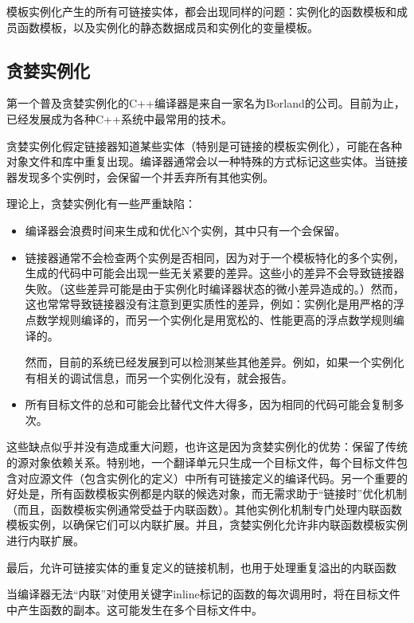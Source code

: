 模板实例化产生的所有可链接实体，都会出现同样的问题：实例化的函数模板和成员函数模板，以及实例化的静态数据成员和实例化的变量模板。

\subsection{贪婪实例化}

第一个普及贪婪实例化的C++编译器是来自一家名为Borland的公司。目前为止，已经发展成为各种C++系统中最常用的技术。

贪婪实例化假定链接器知道某些实体（特别是可链接的模板实例化），可能在各种对象文件和库中重复出现。编译器通常会以一种特殊的方式标记这些实体。当链接器发现多个实例时，会保留一个并丢弃所有其他实例。

理论上，贪婪实例化有一些严重缺陷：

\begin{itemize}
\item 
编译器会浪费时间来生成和优化N个实例，其中只有一个会保留。

\item 
链接器通常不会检查两个实例是否相同，因为对于一个模板特化的多个实例，生成的代码中可能会出现一些无关紧要的差异。这些小的差异不会导致链接器失败。（这些差异可能是由于实例化时编译器状态的微小差异造成的。）然而，这也常常导致链接器没有注意到更实质性的差异，例如：实例化是用严格的浮点数学规则编译的，而另一个实例化是用宽松的、性能更高的浮点数学规则编译的。

\begin{notice}
然而，目前的系统已经发展到可以检测某些其他差异。例如，如果一个实例化有相关的调试信息，而另一个实例化没有，就会报告。
\end{notice}

\item 
所有目标文件的总和可能会比替代文件大得多，因为相同的代码可能会复制多次。
\end{itemize}

这些缺点似乎并没有造成重大问题，也许这是因为贪婪实例化的优势：保留了传统的源对象依赖关系。特别地，一个翻译单元只生成一个目标文件，每个目标文件包含对应源文件（包含实例化的定义）中所有可链接定义的编译代码。另一个重要的好处是，所有函数模板实例都是内联的候选对象，而无需求助于“链接时”优化机制（而且，函数模板实例通常受益于内联函数）。其他实例化机制专门处理内联函数模板实例，以确保它们可以内联扩展。并且，贪婪实例化允许非内联函数模板实例进行内联扩展。

最后，允许可链接实体的重复定义的链接机制，也用于处理重复溢出的内联函数

\begin{notice}
当编译器无法“内联”对使用关键字inline标记的函数的每次调用时，将在目标文件中产生函数的副本。这可能发生在多个目标文件中。
\end{notice}


